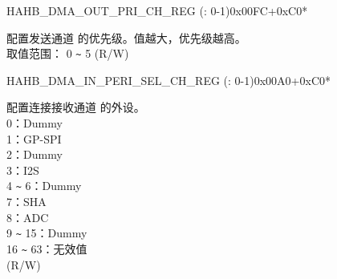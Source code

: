 \begin{register}{H}{AHB\_DMA\_OUT\_PRI\_CH\_REG (: 0-1)}{0x00FC+0xC0*}\label{regdesc:AHBDMAOUTPRICHNREG}
%
%
\regnewline%
\begin{regdesc}\begin{reglist}
\label{fielddesc:AHBDMATXPRICHN}\item [AHB\_DMA\_TX\_PRI\_CH\regindex{n}] 配置发送通道  的优先级。值越大，优先级越高。 \\
取值范围： 0 \verb+~+ 5 (R/W)
\end{reglist}\end{regdesc}
\end{register}


\begin{register}{H}{AHB\_DMA\_IN\_PERI\_SEL\_CH\_REG (: 0-1)}{0x00A0+0xC0*}\label{regdesc:AHBDMAINPERISELCHNREG}
%
%
\regnewline%
\begin{regdesc}\begin{reglist}
\label{fielddesc:AHBDMAPERIINSELCHN}\item [AHB\_DMA\_PERI\_IN\_SEL\_CH\regindex{n}] 配置连接接收通道  的外设。\\
0：Dummy\\ 1：GP-SPI\\ 2：Dummy\\ 3：I2S\\ 4 \verb+~+ 6：Dummy\\ 7：SHA\\ 8：ADC\\ 9 \verb+~+ 15：Dummy\\ 16 \verb+~+ 63：无效值\\ (R/W)
\end{reglist}\end{regdesc}
\end{register}



